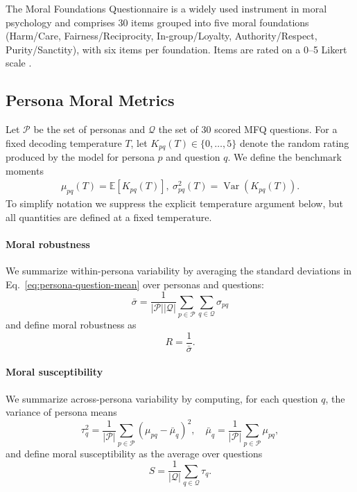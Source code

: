 \documentclass{article}
\begin{document}
The Moral Foundations Questionnaire \citep{moralfoundations2017questionnaires} is a widely used instrument in moral psychology \citep{graham2009liberals,haidt2007when,moralfoundations2017questionnaires} and comprises 30 items grouped into five moral foundations (Harm/Care, Fairness/Reciprocity, In-group/Loyalty, Authority/Respect, Purity/Sanctity), with six items per foundation. Items are rated on a 0–5 Likert scale \citep{graham2011mfq,moralfoundations2017questionnaires}.


\subsection{Persona Moral Metrics}

Let \(\mathcal{P}\) be the set of personas and \(\mathcal{Q}\) the set of 30 scored MFQ questions. For a fixed decoding temperature \(T\), let \(K_{pq}(T)\in\{0,\ldots,5\}\) denote the random rating produced by the model for persona \(p\) and question \(q\). We define the benchmark moments
\begin{align}
  \mu_{pq}(T) = \mathbb{E}[K_{pq}(T)], \ \sigma_{pq}^2(T) = \operatorname{Var}(K_{pq}(T)).
  \label{eq:persona-question-mean}
\end{align}
To simplify notation we suppress the explicit temperature argument below, but all quantities are defined at a fixed temperature.

\paragraph{Moral robustness} We summarize within-persona variability by averaging the standard deviations in Eq.~\eqref{eq:persona-question-mean} over personas and questions:
\begin{equation}
  \label{eq:mean-inv-robustness}
  \bar{\sigma} = \frac{1}{|\mathcal{P}||\mathcal{Q}|}\sum_{p \in \mathcal{P}}\sum_{q \in \mathcal{Q}}\sigma_{pq}
\end{equation}
and define moral robustness as
\begin{equation}
  R = \frac{1}{\bar{\sigma}}.
  \label{eq:robustness}
\end{equation}


\paragraph{Moral susceptibility} We summarize across-persona variability by computing, for each question \(q\), the variance of persona means
\begin{equation}
  \tau_q^2 = \frac{1}{|\mathcal{P}|} \sum_{p \in \mathcal{P}}(\mu_{pq} - \bar{\mu}_q)^2,
  \quad
  \bar{\mu}_q = \frac{1}{|\mathcal{P}|} \sum_{p \in \mathcal{P}} \mu_{pq},
  \label{eq:question-dispersion}
\end{equation}
and define moral susceptibility as the average over questions
\begin{equation}
  \label{eq:overall-susceptibility}
  S = \frac{1}{|\mathcal{Q}|}\sum_{q \in \mathcal{Q}}\tau_q.
\end{equation}
\end{document}
